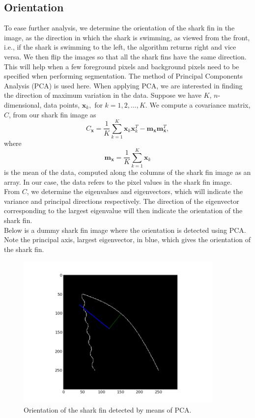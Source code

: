 \documentclass[a4paper,10pt]{article}
\begin{document}
\subsection{Orientation}
\label{orient}
To ease further analysis, we determine the
orientation of the shark fin in the image, as the direction in
which the shark is
swimming, as viewed from the front, i.e., if the shark is swimming to the left,
the algorithm returns right and vice versa.  We then flip the images so that
all the shark fins have the same direction.  This will help when a few foreground
pixels and background pixels need to be specified when performing segmentation.
The method of Principal Components Analysis (PCA) is used here.  When applying
PCA, we are interested in finding the direction of maximum variation in the
data.  Suppose we have $K$, $n$-dimensional, data points, $\mathbf{x}_k,$ for
$k=1,2, \ldots ,K$.  We compute a covariance matrix, $C$, from our shark fin image as 
\[
 C_{\mathbf{x}} = \frac{1}{K} \sum_{k=1}^{K} \mathbf{x}_{k}\mathbf{x}_{k}^{T} -
\mathbf{m}_{\mathbf{x}}\mathbf{m}_{\mathbf{x}}^{T} 
,\]
where
\[
 \mathbf{m}_{\mathbf{x}} = \frac{1}{K} \sum_{k=1}^{K}\mathbf{x}_{k}
\]
is the mean of the data, computed along the columns of the shark fin image as an array. 
In our case, the data refers to the pixel values in the shark fin image.  \\

From $C$, we determine the eigenvalues and eigenvectors, which will indicate the
variance and principal directions respectively.
The direction of the eigenvector corresponding to the largest eigenvalue will
then indicate the orientation of the shark fin. \\

Below is a dummy shark fin image where the orientation is detected using PCA.
Note the principal axis, largest eigenvector, in blue, which gives the
orientation of the shark fin.
\begin{figure}[H]
 \centering
 \includegraphics[width=4in]{orientation.jpg}
 \caption{Orientation of the shark fin detected by means of PCA.}
 \label{orientation}
\end{figure}
\end{document}
